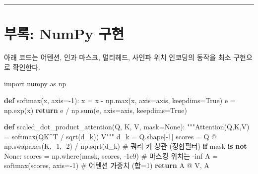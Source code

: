 \documentclass[
  korean,
]{article}
\newenvironment{Shaded}{\begin{snugshade}}{\end{snugshade}}
\newcommand{\BuiltInTok}[1]{\textcolor[rgb]{0.00,0.23,0.31}{#1}}
\newcommand{\CommentTok}[1]{\textcolor[rgb]{0.37,0.37,0.37}{#1}}
\newcommand{\ControlFlowTok}[1]{\textcolor[rgb]{0.00,0.23,0.31}{\textbf{#1}}}
\newcommand{\DecValTok}[1]{\textcolor[rgb]{0.68,0.00,0.00}{#1}}
\newcommand{\FloatTok}[1]{\textcolor[rgb]{0.68,0.00,0.00}{#1}}
\newcommand{\ImportTok}[1]{\textcolor[rgb]{0.00,0.46,0.62}{#1}}
\newcommand{\KeywordTok}[1]{\textcolor[rgb]{0.00,0.23,0.31}{\textbf{#1}}}
\newcommand{\NormalTok}[1]{\textcolor[rgb]{0.00,0.23,0.31}{#1}}
\newcommand{\OperatorTok}[1]{\textcolor[rgb]{0.37,0.37,0.37}{#1}}
\newcommand{\VariableTok}[1]{\textcolor[rgb]{0.07,0.07,0.07}{#1}}
\begin{document}
\begin{center}\rule{0.5\linewidth}{0.5pt}\end{center}

\section{부록: NumPy 구현}\label{sec-appendix}

아래 코드는 어텐션, 인과 마스크, 멀티헤드, 사인파 위치 인코딩의 동작을
최소 구현으로 확인한다.

\begin{Shaded}
\begin{Highlighting}[]
\ImportTok{import}\NormalTok{ numpy }\ImportTok{as}\NormalTok{ np}

\KeywordTok{def}\NormalTok{ softmax(x, axis}\OperatorTok{={-}}\DecValTok{1}\NormalTok{):}
\NormalTok{    x }\OperatorTok{=}\NormalTok{ x }\OperatorTok{{-}}\NormalTok{ np.}\BuiltInTok{max}\NormalTok{(x, axis}\OperatorTok{=}\NormalTok{axis, keepdims}\OperatorTok{=}\VariableTok{True}\NormalTok{)}
\NormalTok{    e }\OperatorTok{=}\NormalTok{ np.exp(x)}
    \ControlFlowTok{return}\NormalTok{ e }\OperatorTok{/}\NormalTok{ np.}\BuiltInTok{sum}\NormalTok{(e, axis}\OperatorTok{=}\NormalTok{axis, keepdims}\OperatorTok{=}\VariableTok{True}\NormalTok{)}

\KeywordTok{def}\NormalTok{ scaled\_dot\_product\_attention(Q, K, V, mask}\OperatorTok{=}\VariableTok{None}\NormalTok{):}
    \CommentTok{"""Attention(Q,K,V) = softmax(QK\^{}T / sqrt(d\_k)) V"""}
\NormalTok{    d\_k }\OperatorTok{=}\NormalTok{ Q.shape[}\OperatorTok{{-}}\DecValTok{1}\NormalTok{]}
\NormalTok{    scores }\OperatorTok{=}\NormalTok{ Q }\OperatorTok{@}\NormalTok{ np.swapaxes(K, }\OperatorTok{{-}}\DecValTok{1}\NormalTok{, }\OperatorTok{{-}}\DecValTok{2}\NormalTok{) }\OperatorTok{/}\NormalTok{ np.sqrt(d\_k)   }\CommentTok{\# 쿼리{-}키 상관 (정합필터)}
    \ControlFlowTok{if}\NormalTok{ mask }\KeywordTok{is} \KeywordTok{not} \VariableTok{None}\NormalTok{:}
\NormalTok{        scores }\OperatorTok{=}\NormalTok{ np.where(mask, scores, }\OperatorTok{{-}}\FloatTok{1e9}\NormalTok{)            }\CommentTok{\# 마스킹 위치는 {-}inf}
\NormalTok{    A }\OperatorTok{=}\NormalTok{ softmax(scores, axis}\OperatorTok{={-}}\DecValTok{1}\NormalTok{)                         }\CommentTok{\# 어텐션 가중치 (합=1)}
    \ControlFlowTok{return}\NormalTok{ A }\OperatorTok{@}\NormalTok{ V, A}
\end{Highlighting}
\end{Shaded}
\end{document}
